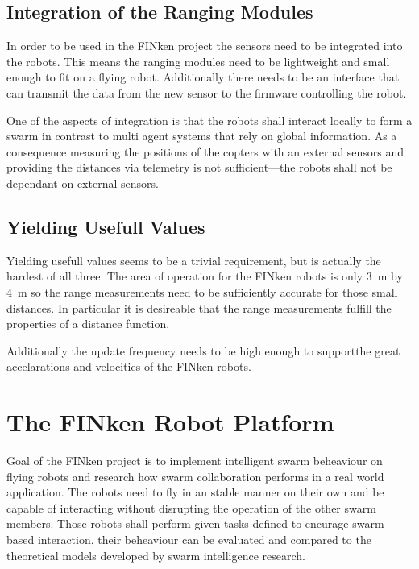 \subsection{Integration of the Ranging Modules}
\label{req2}
In order to be used in the FINken project the sensors need to be integrated into the robots.
This means the ranging modules need to be lightweight and small enough to fit on a flying robot.
Additionally there needs to be an interface that can transmit the data from the new sensor to the firmware controlling the robot.

One of the aspects of integration is that the robots shall interact locally to form a swarm in contrast to multi agent systems that rely on global information.
As a consequence measuring the positions of the copters with an external sensors and providing the distances via telemetry is not sufficient—the robots shall not be dependant on external sensors.

\subsection{Yielding Usefull Values}
\label{req3}
Yielding usefull values seems to be a trivial requirement, but is actually the hardest of all three.
The area of operation for the FINken robots is only \SI{3}{m} by \SI{4}{m} so the range measurements need to be sufficiently accurate for those small distances. 
In particular it is desireable that the range measurements fulfill the properties of a distance function.

Additionally the update frequency needs to be high enough to supportthe great accelarations and velocities of the FINken robots.


\section{The FINken Robot Platform}


Goal of the FINken project is to implement intelligent swarm beheaviour on flying robots and research how swarm collaboration performs in a real world application.
The robots need to fly in an stable manner on their own and be capable of interacting without disrupting the operation of the other swarm members.
Those robots shall perform given tasks defined to encurage swarm based interaction, their beheaviour can be evaluated and compared to the theoretical models developed by swarm intelligence research.

